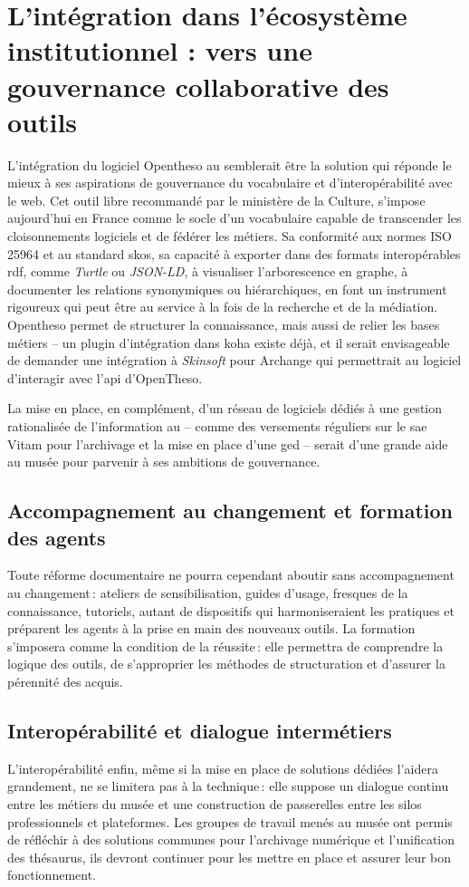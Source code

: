 \section{\label{III-A-3}L’intégration dans l’écosystème institutionnel : vers une gouvernance collaborative des outils}

L’intégration du logiciel Opentheso au \mae semblerait être la solution qui réponde le mieux à ses aspirations de gouvernance du vocabulaire et d'interopérabilité avec le web. Cet outil libre recommandé par le ministère de la Culture, s’impose aujourd'hui en France comme le socle d’un vocabulaire  capable de transcender les cloisonnements logiciels et de fédérer les métiers. Sa conformité aux normes ISO 25964 et au standard \ac{skos}, sa capacité à exporter dans des formats interopérables \ac{rdf}, comme \textit{Turtle} ou \textit{JSON-LD}, à visualiser l’arborescence en graphe, à documenter les relations synonymiques ou hiérarchiques, en font un instrument rigoureux qui peut être au service à la fois de la recherche et de la médiation. Opentheso permet de structurer la connaissance, mais aussi de relier les bases métiers – un plugin d'intégration dans \gls{koha} existe déjà, et il serait envisageable de demander une intégration à \textit{Skinsoft} pour Archange qui permettrait au logiciel d'interagir avec l'\ac{api} d'OpenTheso.

La mise en place, en complément, d'un réseau de logiciels dédiés à une gestion rationalisée de l'information au \mae -- comme des versements réguliers sur le \ac{sae} Vitam pour l’archivage et la mise en place d'une \ac{ged} – serait d'une grande aide au musée pour parvenir à ses ambitions de gouvernance.

\subsection{Accompagnement au changement et formation des agents}

Toute réforme documentaire ne pourra cependant aboutir sans accompagnement au changement : ateliers de sensibilisation, guides d’usage, fresques de la connaissance, tutoriels, autant de dispositifs qui harmoniseraient les pratiques et préparent les agents à la prise en main des nouveaux outils. La formation s'imposera comme la condition de la réussite : elle permettra de comprendre la logique des outils, de s’approprier les méthodes de structuration et d’assurer la pérennité des acquis.

\subsection{Interopérabilité et dialogue intermétiers}

L’interopérabilité enfin, même si la mise en place de solutions dédiées l'aidera grandement, ne se limitera pas à la technique : elle suppose un dialogue continu entre les métiers du musée et une construction de passerelles entre les silos professionnels et plateformes. Les groupes de travail menés au musée ont permis de réfléchir à des solutions communes pour l’archivage numérique et l'unification des thésaurus, ils devront continuer pour les mettre en place et assurer leur bon fonctionnement. 

